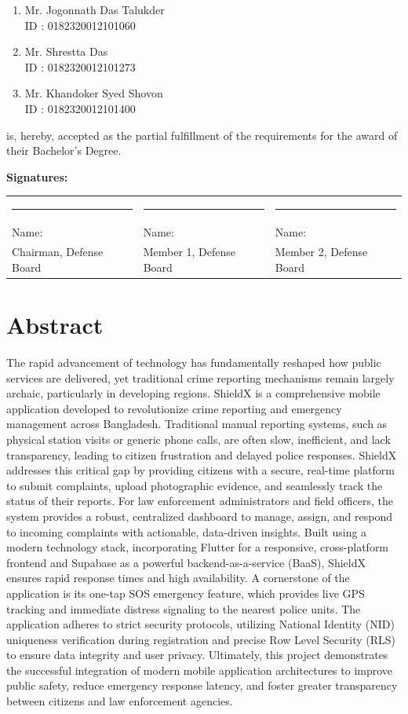 \documentclass[12pt, a4paper, twoside, openany]{report}
\begin{document}
\begin{enumerate}[label=\arabic*.]
    \item Mr. Jogonnath Das Talukder\\
          ID : 0182320012101060
    \item Mr. Shrestta Das\\
          ID : 0182320012101273
    \item Mr. Khandoker Syed Shovon\\
          ID : 0182320012101400
\end{enumerate}

is, hereby, accepted as the partial fulfillment of the requirements for the award of their Bachelor's Degree.
\vspace{3cm}

\noindent\textbf{Signatures:}\\[2cm]
\noindent
\begin{tabularx}{\textwidth}{@{}XXX@{}}
    \rule{4.5cm}{0.4pt} & \rule{4.5cm}{0.4pt} & \rule{4.5cm}{0.4pt} \\
    Name: & Name: & Name: \\[0.5cm]
    Chairman, Defense Board & Member 1, Defense Board & Member 2, Defense Board
\end{tabularx}
\chapter*{Abstract}
The rapid advancement of technology has fundamentally reshaped how public services are delivered, yet traditional crime reporting mechanisms remain largely archaic, particularly in developing regions. ShieldX is a comprehensive mobile application developed to revolutionize crime reporting and emergency management across Bangladesh. Traditional manual reporting systems, such as physical station visits or generic phone calls, are often slow, inefficient, and lack transparency, leading to citizen frustration and delayed police responses. 
ShieldX addresses this critical gap by providing citizens with a secure, real-time platform to submit complaints, upload photographic evidence, and seamlessly track the status of their reports. For law enforcement administrators and field officers, the system provides a robust, centralized dashboard to manage, assign, and respond to incoming complaints with actionable, data-driven insights. Built using a modern technology stack, incorporating Flutter for a responsive, cross-platform frontend and Supabase as a powerful backend-as-a-service (BaaS), ShieldX ensures rapid response times and high availability. 
A cornerstone of the application is its one-tap SOS emergency feature, which provides live GPS tracking and immediate distress signaling to the nearest police units. The application adheres to strict security protocols, utilizing National Identity (NID) uniqueness verification during registration and precise Row Level Security (RLS) to ensure data integrity and user privacy. Ultimately, this project demonstrates the successful integration of modern mobile application architectures to improve public safety, reduce emergency response latency, and foster greater transparency between citizens and law enforcement agencies.
\end{document}
